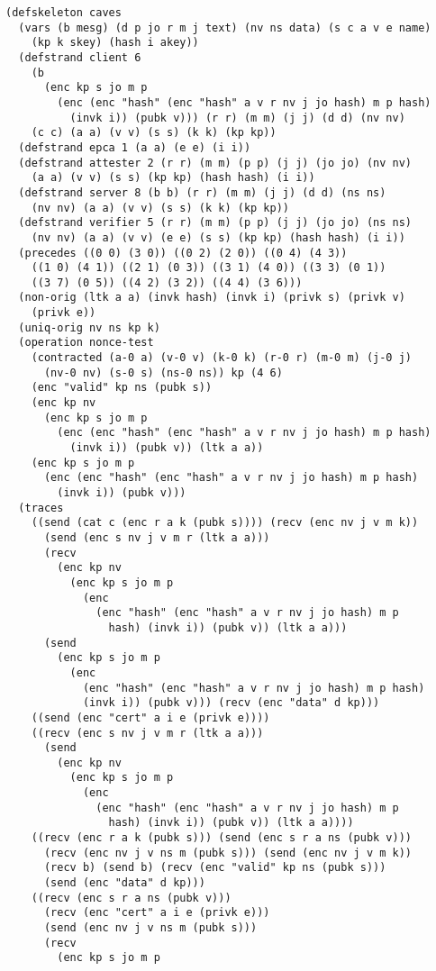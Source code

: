 \documentclass[titlepage,12pt]{article}
\theoremstyle{definition}
\begin{document}
\begin{verbatim}
(defskeleton caves
  (vars (b mesg) (d p jo r m j text) (nv ns data) (s c a v e name)
    (kp k skey) (hash i akey))
  (defstrand client 6
    (b
      (enc kp s jo m p
        (enc (enc "hash" (enc "hash" a v r nv j jo hash) m p hash)
          (invk i)) (pubk v))) (r r) (m m) (j j) (d d) (nv nv)
    (c c) (a a) (v v) (s s) (k k) (kp kp))
  (defstrand epca 1 (a a) (e e) (i i))
  (defstrand attester 2 (r r) (m m) (p p) (j j) (jo jo) (nv nv)
    (a a) (v v) (s s) (kp kp) (hash hash) (i i))
  (defstrand server 8 (b b) (r r) (m m) (j j) (d d) (ns ns)
    (nv nv) (a a) (v v) (s s) (k k) (kp kp))
  (defstrand verifier 5 (r r) (m m) (p p) (j j) (jo jo) (ns ns)
    (nv nv) (a a) (v v) (e e) (s s) (kp kp) (hash hash) (i i))
  (precedes ((0 0) (3 0)) ((0 2) (2 0)) ((0 4) (4 3))
    ((1 0) (4 1)) ((2 1) (0 3)) ((3 1) (4 0)) ((3 3) (0 1))
    ((3 7) (0 5)) ((4 2) (3 2)) ((4 4) (3 6)))
  (non-orig (ltk a a) (invk hash) (invk i) (privk s) (privk v)
    (privk e))
  (uniq-orig nv ns kp k)
  (operation nonce-test
    (contracted (a-0 a) (v-0 v) (k-0 k) (r-0 r) (m-0 m) (j-0 j)
      (nv-0 nv) (s-0 s) (ns-0 ns)) kp (4 6)
    (enc "valid" kp ns (pubk s))
    (enc kp nv
      (enc kp s jo m p
        (enc (enc "hash" (enc "hash" a v r nv j jo hash) m p hash)
          (invk i)) (pubk v)) (ltk a a))
    (enc kp s jo m p
      (enc (enc "hash" (enc "hash" a v r nv j jo hash) m p hash)
        (invk i)) (pubk v)))
  (traces
    ((send (cat c (enc r a k (pubk s)))) (recv (enc nv j v m k))
      (send (enc s nv j v m r (ltk a a)))
      (recv
        (enc kp nv
          (enc kp s jo m p
            (enc
              (enc "hash" (enc "hash" a v r nv j jo hash) m p
                hash) (invk i)) (pubk v)) (ltk a a)))
      (send
        (enc kp s jo m p
          (enc
            (enc "hash" (enc "hash" a v r nv j jo hash) m p hash)
            (invk i)) (pubk v))) (recv (enc "data" d kp)))
    ((send (enc "cert" a i e (privk e))))
    ((recv (enc s nv j v m r (ltk a a)))
      (send
        (enc kp nv
          (enc kp s jo m p
            (enc
              (enc "hash" (enc "hash" a v r nv j jo hash) m p
                hash) (invk i)) (pubk v)) (ltk a a))))
    ((recv (enc r a k (pubk s))) (send (enc s r a ns (pubk v)))
      (recv (enc nv j v ns m (pubk s))) (send (enc nv j v m k))
      (recv b) (send b) (recv (enc "valid" kp ns (pubk s)))
      (send (enc "data" d kp)))
    ((recv (enc s r a ns (pubk v)))
      (recv (enc "cert" a i e (privk e)))
      (send (enc nv j v ns m (pubk s)))
      (recv
        (enc kp s jo m p

\end{verbatim}
\end{document}
